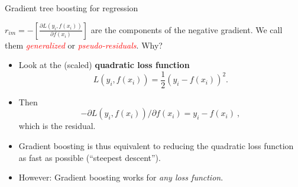 \documentclass[
  10pt,
  ignorenonframetext,
]{beamer}
\providecommand{\tightlist}{%
  \setlength{\itemsep}{0pt}\setlength{\parskip}{0pt}}
\begin{document}
\begin{frame}
\begin{block}{Gradient tree boosting for regression}
\label{gradient-tree-boosting-for-regression}
\(~\)

\(r_{im} = - \left[ \frac{\partial L(y_i,f(x_i))}{\partial f(x_i)} \right]\)
are the components of the negative gradient. We call them
\emph{\textcolor{red}{generalized}} or
\emph{\textcolor{red}{pseudo-residuals}}. Why?

\vspace{8mm}

\begin{itemize}
\tightlist
\item
  Look at the (scaled) \textbf{quadratic loss function}
  \[L(y_i,f(x_i)) = \frac{1}{2} (y_i-f(x_i))^2.\]
\end{itemize}

\vspace{2mm}

\begin{itemize}
\tightlist
\item
  Then \[-\partial L(y_i,f(x_i))/\partial f(x_i) = y_i - f(x_i) \ , \]
  which is the residual.
\end{itemize}

\vspace{2mm}

\begin{itemize}
\tightlist
\item
  Gradient boosting is thus equivalent to reducing the quadratic loss
  function as fast as possible (``steepest descent'').
\end{itemize}

\vspace{2mm}

\begin{itemize}
\tightlist
\item
  However: Gradient boosting works for \emph{any loss function}.
\end{itemize}
\end{block}
\end{frame}
\end{document}
